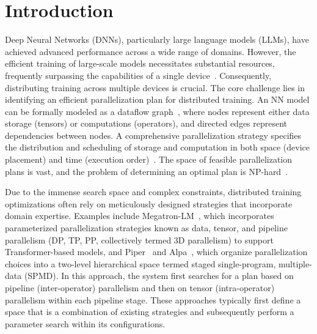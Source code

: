 \documentclass[letterpaper,twocolumn,10pt]{article}
\begin{document}
\section{Introduction}
\label{sec:intro}

Deep Neural Networks (DNNs), particularly large language models (LLMs), have achieved advanced performance across a wide range of domains. However, the efficient training of large-scale models necessitates substantial resources, frequently surpassing the capabilities of a single device~\cite{narayanan2021efficient}. Consequently, distributing training across multiple devices is crucial. The core challenge lies in identifying an efficient parallelization plan for distributed training. An NN model can be formally modeled as a dataflow graph~\cite{lin2023songc}, where nodes represent either data storage (tensors) or computations (operators), and directed edges represent dependencies between nodes. A comprehensive parallelization strategy specifies the distribution and scheduling of storage and computation in both space (device placement) and time (execution order)~\cite{qiu2025moirai, huang2019yugong, lin2024nnscaler}. The space of feasible parallelization plans is vast, and the problem of determining an optimal plan is NP-hard~\cite{liu2024aceso}.

Due to the immense search space and complex constraints, distributed training optimizations often rely on meticulously designed strategies that incorporate domain expertise. Examples include Megatron-LM~\cite{shoeybi2019megatron, narayanan2021efficient}, which incorporates parameterized parallelization strategies known as data, tensor, and pipeline parallelism (DP, TP, PP, collectively termed 3D parallelism) to support Transformer-based models, and Piper~\cite{tarnawski2021piper} and Alpa~\cite{zheng2022alpa}, which organize parallelization choices into a two-level hierarchical space termed staged single-program, multiple-data (SPMD). In this approach, the system first searches for a plan based on pipeline (inter-operator) parallelism and then on tensor (intra-operator) parallelism within each pipeline stage. These approaches typically first define a space that is a combination of existing strategies and subsequently perform a parameter search within its configurations.
\end{document}
